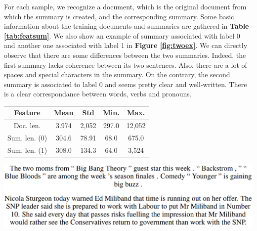 \documentclass{article}
\newenvironment{Figure}
  {\par\medskip\noindent\minipage{\linewidth}}
  {\endminipage\par\medskip}
\begin{document}
\begin{multicols}{2}
For each sample, we recognize a document, which is the original document from which the summary is created, and the corresponding summary. Some basic information about the training documents and summaries are gathered in \textbf{Table \ref{tab:featsum}}. We also show an example of summary associated with label 0 and another one associated with label 1 in \textbf{Figure \ref{fig:twoex}}. We can directly observe that there are some differences between the two summaries. Indeed, the first summary lacks coherence between its two sentences. Also, there are a lot of spaces and special characters in the summary. On the contrary, the second summary is associated to label 0 and seems pretty clear and well-written. There is a clear correspondance between words, verbs and pronouns.

\begin{center}
\captionsetup{type=tabular}
  \begin{tabular}{|c|cccc|}
    \hline
    Feature & Mean & Std & Min. & Max. \\
    \hline
    Doc. len. & 3.974 & 2,052 & 297.0 & 12,052 \\
    Sum. len. (0) & 304.6 & 78.91 & 68.0 & 675.0 \\
    Sum. len. (1) & 308.0 & 134.3 & 64.0 & 3,524 \\
    \hline
  \end{tabular}
\label{tab:featsum}
\end{center}

\begin{Figure}
  \centering
  \captionsetup{type=figure}
  \includegraphics[width=\linewidth]{figures/two_examples.png}
  \label{fig:twoex}
\end{Figure}


\end{multicols}
\end{document}
